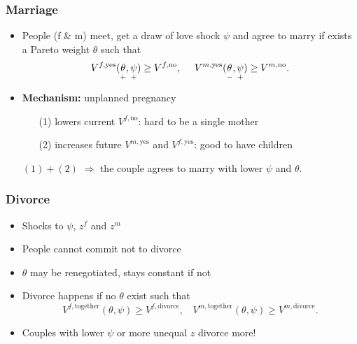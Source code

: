 \documentclass{beamer}
\begin{document}
\begin{frame}
\frametitle{Marriage}
\begin{itemize}
\item People (f \& m) meet, get a draw of love shock $\psi$ and agree to marry if exists a Pareto weight $\theta$ such that
\[V^{f,\text{yes}}(\underset{\scriptsize +}{\theta\vphantom{\psi}},\underset{\scriptsize +}{\psi}) \geq V^{f,\text{no}}, \ \ \ \ V^{m,\text{yes}}(\underset{\scriptsize  -}{\theta\vphantom{\psi}},\underset{\scriptsize +}{\psi}) \geq V^{m,\text{no}}.\]
\item \textbf{Mechanism:} unplanned pregnancy 
\begin{enumerate}
\item[(1)] lowers current $V^{f,\text{no}}$: hard to be a single mother
\item[(2)] increases future $V^{m,\text{yes}}$ and $V^{f,\text{yes}}$: good to have children
\end{enumerate} 
$(1) + (2)$ $\Rightarrow$ the couple agrees to marry with lower $\psi$ and $\theta$.
\end{itemize}
\end{frame}

\begin{frame}
\frametitle{Divorce}
\begin{itemize}
\item Shocks to $\psi$, $z^f$ and $z^m$
\item People cannot commit not to divorce
\item $\theta$ may be renegotiated, stays constant if not
\item Divorce happens if no $\theta$ exist such that
\[V^{f,\text{together}}(\theta,\psi) \geq V^{f,\text{divorce}}, \ \ \ \ V^{m,\text{together}}(\theta,\psi) \geq V^{m,\text{divorce}}.\]
\item Couples with lower $\psi$ or more unequal $z$ divorce more!
\end{itemize}
\end{frame}


%
%
\end{document}
